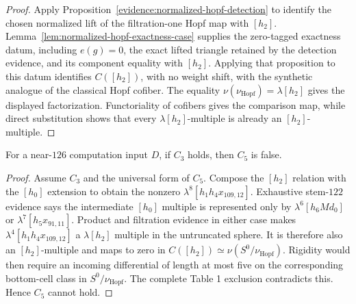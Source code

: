 \begin{proof}
  Apply Proposition~\ref{evidence:normalized-hopf-detection} to identify the
  chosen normalized lift of the filtration-one Hopf map with $[h_2]$.
  Lemma~\ref{lem:normalized-hopf-exactness-case} supplies the zero-tagged
  exactness datum, including $e(g)=0$, the exact lifted triangle retained by
  the detection evidence, and its component equality with $[h_2]$.  Applying that proposition
  to this datum identifies $C([h_2])$, with no weight shift, with the synthetic
  analogue of the classical Hopf cofiber.  The equality
  $\nu(\nu_{\mathrm{Hopf}})=\lambda[h_2]$ gives the displayed factorization.
  Functoriality of cofibers gives the comparison map, while direct substitution
  shows that every $\lambda[h_2]$-multiple is already an $[h_2]$-multiple.
\end{proof}

\begin{proposition}[$C_3$ excludes $C_5$]
  \label{prop:near126-c3-not-c5}
  \notready
  For a near-$126$ computation input $D$, if $C_3$ holds, then $C_5$ is false.
\end{proposition}

\begin{proof}
  Assume $C_3$ and the universal form of $C_5$.  Compose the $[h_2]$ relation
  with the $[h_0]$ extension to obtain the nonzero
  $\lambda^8[h_1h_4x_{109,12}]$.  Exhaustive stem-$122$ evidence says the
  intermediate $[h_0]$ multiple is represented only by
  $\lambda^6[h_6Md_0]$ or $\lambda^7[h_5x_{91,11}]$.  Product and filtration
  evidence in either case makes
  $\lambda^4[h_1h_4x_{109,12}]$ a $\lambda[h_2]$ multiple in the untruncated
  sphere.  It is therefore also an $[h_2]$-multiple and maps to zero in
  $C([h_2])\simeq\nu(S^0/\nu_{\mathrm{Hopf}})$.  Rigidity would then require an
  incoming differential of length at most five on the corresponding
  bottom-cell class in $S^0/\nu_{\mathrm{Hopf}}$.  The complete Table 1 exclusion
  contradicts this.  Hence $C_5$ cannot hold.
\end{proof}

